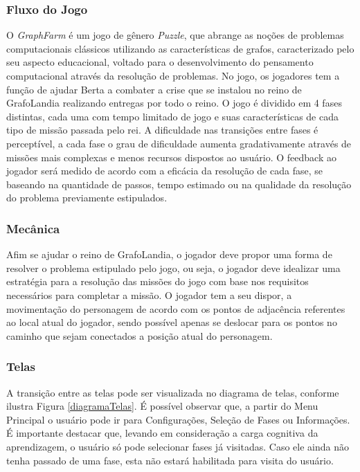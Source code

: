\documentclass[10pt, conference, compsocconf]{IEEEtran}
\begin{document}
\subsubsection{Fluxo do Jogo}
O \textit{GraphFarm} é um jogo de gênero \textit{Puzzle}, que abrange as noções de problemas computacionais clássicos utilizando as características de grafos, caracterizado pelo seu aspecto educacional, voltado para o desenvolvimento do pensamento computacional através da resolução de problemas. No jogo, os jogadores tem a função de ajudar Berta a combater a crise que se instalou no reino de GrafoLandia realizando entregas por todo o reino. O jogo é dividido em 4 fases distintas, cada uma com tempo limitado de jogo e suas características de cada tipo de missão passada pelo rei. A dificuldade nas transições entre fases é perceptível, a cada fase o grau de dificuldade aumenta gradativamente através de missões mais complexas e menos recursos dispostos ao usuário. O feedback ao jogador será medido de acordo com a eficácia da resolução de cada fase, se baseando na quantidade de passos, tempo estimado ou na qualidade da resolução do problema previamente estipulados.

\subsubsection{Mecânica}
Afim se ajudar o reino de GrafoLandia, o jogador deve propor uma forma de resolver o problema estipulado pelo jogo, ou seja, o jogador deve idealizar uma estratégia para a resolução das missões do jogo com base nos requisitos necessários para completar a missão. O jogador tem a seu dispor, a movimentação do personagem de acordo com os pontos de adjacência referentes ao local atual do jogador, sendo possível apenas se deslocar para os pontos no caminho que sejam conectados a posição atual do personagem. 




\subsubsection{Telas}\label{GDD}
A transição entre as telas pode ser visualizada no diagrama de telas, conforme ilustra Figura \ref{diagramaTelas}. É possível observar que, a partir do Menu Principal o usuário pode ir para Configurações, Seleção de Fases ou Informações. É importante destacar que, levando em consideração a carga cognitiva da aprendizagem, o usuário só pode selecionar fases já visitadas. Caso ele ainda não tenha passado de uma fase, esta não estará habilitada para visita do usuário.
\end{document}
